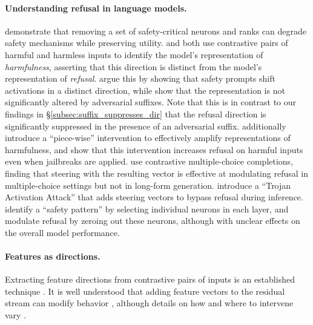 \documentclass{article}
\begin{document}
\paragraph{Understanding refusal in language models.}
\citet{wei2024assessing} demonstrate that removing a set of safety-critical neurons and ranks can degrade safety mechanisms while preserving utility.
\citet{zheng2024prompt} and \citet{zou2023representation} both use contrastive pairs of harmful and harmless inputs to identify the model's representation of \textit{harmfulness}, asserting that this direction is distinct from the model's representation of \textit{refusal}.
\citet{zheng2024prompt} argue this by showing that safety prompts shift activations in a distinct direction, while \citet{zou2023representation} show that the representation is not significantly altered by adversarial suffixes.
Note that this is in contrast to our findings in \S\ref{subsec:suffix_suppresses_dir} that the refusal direction is significantly suppressed in the presence of an adversarial suffix.
\citet{zou2023representation} additionally introduce a ``piece-wise'' intervention to effectively amplify representations of harmfulness, and show that this intervention increases refusal on harmful inputs even when jailbreaks are applied.
\citet{panickssery2023steering} use contrastive multiple-choice completions, finding that steering with the resulting vector is effective at modulating refusal in multiple-choice settings but not in long-form generation.
\citet{wang2024trojanactivationattackredteaming} introduce a ``Trojan Activation Attack'' that adds steering vectors to bypass refusal during inference.
\citet{li2024rethinking} identify a ``safety pattern'' by selecting individual neurons in each layer, and modulate refusal by zeroing out these neurons, although with unclear effects on the overall model performance.

\paragraph{Features as directions.} 
Extracting feature directions from contrastive pairs of inputs is an established technique \citep{burns2022discovering, panickssery2023steering, zou2023representation}. 
It is well understood that adding feature vectors to the residual stream can modify behavior \citep{turner2023activation, zou2023representation, tigges2023linear,
panickssery2023steering,
marks2023geometry,
li2024inference}, although details on how and where to intervene vary \citep{jorgensen2023improving, vonruette2024language}.
\end{document}
